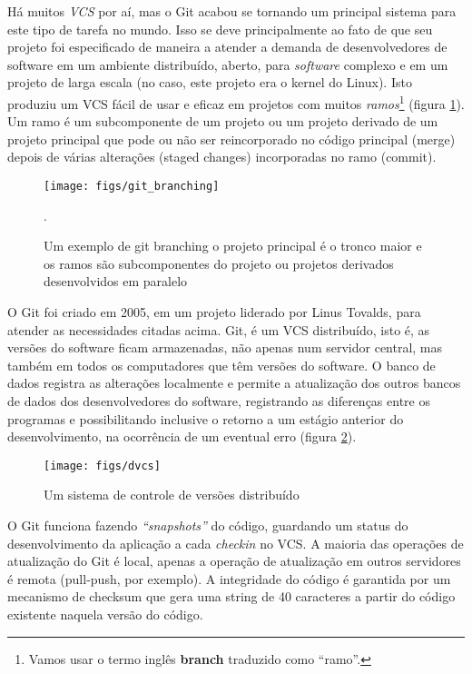 \documentclass[12pt,a4paper]{article}
\begin{document}
Há muitos \textit{VCS} por aí, mas o Git acabou se tornando um principal sistema para este tipo de tarefa no mundo. Isso se deve principalmente ao fato de que seu projeto foi especificado de maneira a atender a demanda de desenvolvedores de software em um ambiente distribuído, aberto, para \textit{software} complexo e em um projeto de larga escala (no caso, este projeto era o kernel do Linux). Isto produziu um VCS fácil de usar e eficaz em projetos com muitos \textit{ramos}\footnote{Vamos usar o termo inglês \textbf{branch} traduzido como ``ramo''.} (figura \ref{fig:gitbranching}). Um ramo é um subcomponente de um projeto ou um projeto derivado de um projeto principal que pode ou não ser reincorporado no código principal (merge) depois de várias alterações (staged changes) incorporadas no ramo (commit).

\begin{figure}
	\centering
	\texttt{[image: figs/git\_branching]}
	\caption[git branching]{Um exemplo de git branching o projeto principal é o tronco maior e os ramos são subcomponentes do projeto ou projetos derivados desenvolvidos em paralelo\citep{Burke2015}}.
	\label{fig:gitbranching}
\end{figure}

O Git foi criado em 2005, em um projeto liderado por Linus Tovalds, para atender as necessidades citadas acima. Git, é um VCS distribuído, isto é, as versões do software ficam armazenadas, não apenas num servidor central, mas também em todos os computadores que têm versões do software. O banco de dados registra as alterações localmente e permite a atualização dos outros bancos de dados dos desenvolvedores do software, registrando as diferenças entre os programas e possibilitando inclusive o retorno a um estágio anterior do desenvolvimento, na ocorrência de um eventual erro (figura \ref{fig:dvcs}).

\begin{figure}
	\centering
	\texttt{[image: figs/dvcs]}
	\caption{Um sistema de controle de versões distribuído \citep[p. 12]{Chacon2014}}
	\label{fig:dvcs}
\end{figure}

O Git funciona fazendo \textit{``snapshots''} do código, guardando um status do desenvolvimento da aplicação a cada \textit{checkin} no VCS. A maioria das operações de atualização do Git é local, apenas a operação de atualização em outros servidores é remota (pull-push, por exemplo).  A integridade do código é garantida por um mecanismo de checksum que gera uma string de 40 caracteres a partir do código existente naquela versão do código.
\end{document}
